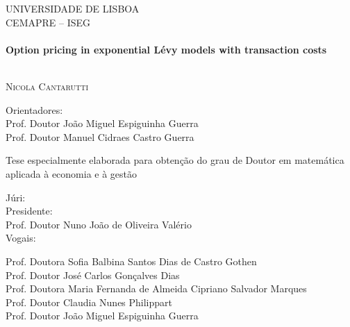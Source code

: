 \begin{titlepage}
\begin{center}



\textsc{\Large UNIVERSIDADE DE LISBOA}\\[0.5cm]
\textsc{\Large CEMAPRE -- ISEG}\\[1cm]


\HRule \\[0.4cm]
{ \huge \bfseries Option pricing in exponential Lévy models with transaction costs \\[0.4cm] }

\HRule \\[1.5cm]


\textsc{\LARGE Nicola Cantarutti}\\[1.5cm]


\noindent
\begin{flushleft} \large
Orientadores:\\[0.2cm]
   Prof. Doutor João Miguel Espiguinha Guerra\\
   Prof. Doutor Manuel Cidraes Castro Guerra\\
\end{flushleft}
\vspace{2.5em}


{Tese especialmente elaborada para obtenção do grau de Doutor em matemática aplicada à economia e à gestão}\\[2em]

\noindent
\begin{flushleft} \large
Júri:\\[0.2cm]
Presidente:\\
Prof. Doutor Nuno João de Oliveira Valério\\[0.2cm]
Vogais:\\
\begin{adjustwidth}{0pt}{-100pt}
Prof. Doutora Sofia Balbina Santos Dias de Castro Gothen\\
Prof. Doutor José Carlos Gonçalves Dias\\
Prof. Doutora Maria Fernanda de Almeida Cipriano Salvador Marques\\ 
Prof. Doutor Claudia Nunes Philippart\\
Prof. Doutor João Miguel Espiguinha Guerra
\end{adjustwidth} 
\end{flushleft}




\end{center}
\end{titlepage}
